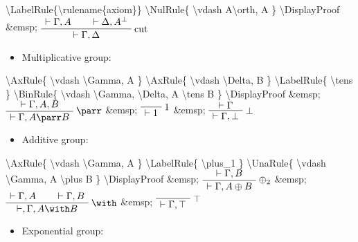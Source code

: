 \textbackslash{}LabelRule\{\textbackslash{}rulename\{axiom\}\}
\textbackslash{}NulRule\{ \textbackslash{}vdash A\textbackslash{}orth, A
\} \textbackslash{}DisplayProof \&emsp; \(\AxRule{ \vdash \Gamma, A }
\AxRule{ \vdash \Delta, A\orth }
\LabelRule{\rulename{cut}}
\BinRule{ \vdash \Gamma, \Delta }
\DisplayProof\)

\begin{itemize}
\tightlist
\item
  Multiplicative group:

  \begin{description}
  \tightlist
  \item[]
  \end{description}
\end{itemize}

\textbackslash{}AxRule\{ \textbackslash{}vdash \textbackslash{}Gamma, A
\} \textbackslash{}AxRule\{ \textbackslash{}vdash \textbackslash{}Delta,
B \} \textbackslash{}LabelRule\{ \textbackslash{}tens \}
\textbackslash{}BinRule\{ \textbackslash{}vdash \textbackslash{}Gamma,
\textbackslash{}Delta, A \textbackslash{}tens B \}
\textbackslash{}DisplayProof \&emsp; \(\AxRule{ \vdash \Gamma, A, B }
\LabelRule{ \parr }
\UnaRule{ \vdash \Gamma, A \parr B }
\DisplayProof\) \&emsp; \(\LabelRule{ \one }
\NulRule{ \vdash \one }
\DisplayProof\) \&emsp; \(\AxRule{ \vdash \Gamma }
\LabelRule{ \bot }
\UnaRule{ \vdash \Gamma, \bot }
\DisplayProof\)

\begin{itemize}
\tightlist
\item
  Additive group:

  \begin{description}
  \tightlist
  \item[]
  \end{description}
\end{itemize}

\textbackslash{}AxRule\{ \textbackslash{}vdash \textbackslash{}Gamma, A
\} \textbackslash{}LabelRule\{ \textbackslash{}plus\_1 \}
\textbackslash{}UnaRule\{ \textbackslash{}vdash \textbackslash{}Gamma, A
\textbackslash{}plus B \} \textbackslash{}DisplayProof \&emsp;
\(\AxRule{ \vdash \Gamma, B }
\LabelRule{ \plus_2 }
\UnaRule{ \vdash \Gamma, A \plus B }
\DisplayProof\) \&emsp; \(\AxRule{ \vdash \Gamma, A }
\AxRule{ \vdash \Gamma, B }
\LabelRule{ \with }
\BinRule{ \vdash, \Gamma, A \with B }
\DisplayProof\) \&emsp; \(\LabelRule{ \top }
\NulRule{ \vdash \Gamma, \top }
\DisplayProof\)

\begin{itemize}
\tightlist
\item
  Exponential group:

  \begin{description}
  \tightlist
  \item[]
  \end{description}
\end{itemize}

